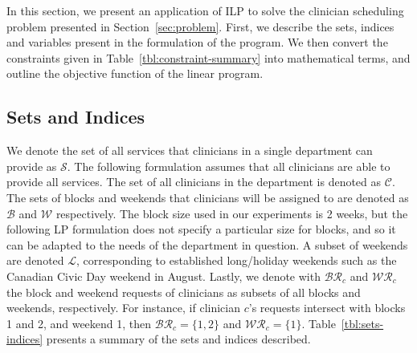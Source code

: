 In this section, we present an application of ILP to solve the clinician
scheduling problem presented in Section~\ref{sec:problem}. First, we describe
the sets, indices and variables present in the formulation of the program. We
then convert the constraints given in Table~\ref{tbl:constraint-summary} into
mathematical terms, and outline the objective function of the linear program.

\subsection{Sets and Indices}\label{sec:meth-sets-indices}
We denote the set of all services %
that clinicians in a single department can provide as $\mathcal{S}$. The
following formulation assumes that all clinicians are able to provide all
services. The set of all clinicians in the department is denoted as
$\mathcal{C}$. The sets of blocks and weekends that clinicians will be assigned
to are denoted as $\mathcal{B}$ and $\mathcal{W}$ respectively. The block size
used in our experiments is 2 weeks, but the following LP formulation does not
specify a particular size for blocks, and so it can be adapted to the needs of
the department in question.
A subset of weekends are denoted $\mathcal{L}$, corresponding to established
long/holiday weekends such as the Canadian Civic Day weekend in August. Lastly,
we denote with $\mathcal{BR}_c$ and $\mathcal{WR}_c$ the block and weekend
requests of clinicians as subsets of all blocks and weekends, respectively. For
instance, if clinician $c$'s requests intersect with blocks 1 and 2, and weekend
1, then $\mathcal{BR}_c = \{1, 2\}$ and $\mathcal{WR}_c = \{1\}$. Table~\ref{tbl:sets-indices} presents a summary of the sets and indices described. 

